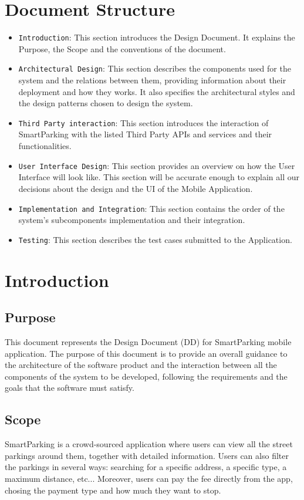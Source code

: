 \documentclass[11pt]{article} %
\begin{document}
\section{Document Structure}
\begin{itemize}

\item \texttt{Introduction}: This section introduces the Design Document. It explains the Purpose, the Scope and the conventions of the document.
\item \texttt{Architectural Design}: This section describes the components used for the system and the relations between them, providing information about their deployment and how they works. It also specifies the architectural styles and the design patterns chosen to design the system.
\item \texttt{Third Party interaction}: This section introduces the interaction of SmartParking with the listed Third Party APIs and services and their functionalities.
\item \texttt{User Interface Design}: This section provides an overview on how the User Interface will look like. This section will be accurate enough to explain all our decisions about the design and the UI of the Mobile Application. 
\item \texttt{Implementation and Integration}: This section contains the order of the system's subcomponents implementation and their integration.
\item \texttt{Testing}: This section describes the test cases submitted to the Application.


\end{itemize}

\section{Introduction}

\subsection{Purpose}
This document represents the Design Document (DD) for SmartParking mobile application. The purpose of this document is to provide an overall guidance to the architecture of the software product and the interaction between all the components of the system to be developed, following the requirements and the goals that the software must satisfy.

\subsection{Scope}
SmartParking is a crowd-sourced application where users can view all the street parkings around them, together with detailed information. Users can also filter the parkings in several ways: searching for a specific address, a specific type, a maximum distance, etc... Moreover, users can pay the fee directly from the app, chosing the payment type and how much they want to stop.
\end{document}
